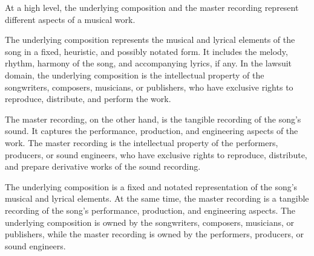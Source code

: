 At a high level, the underlying composition and the master recording represent different aspects of a musical work.

The underlying composition represents the musical and lyrical elements of the song in a fixed, heuristic, and possibly notated form. It includes the melody, rhythm, harmony of the song, and accompanying lyrics, if any. In the lawsuit domain, the underlying composition is the intellectual property of the songwriters, composers, musicians, or publishers, who have exclusive rights to reproduce, distribute, and perform the work.

The master recording, on the other hand, is the tangible recording of the song's sound. It captures the performance, production, and engineering aspects of the work. The master recording is the intellectual property of the performers, producers, or sound engineers, who have exclusive rights to reproduce, distribute, and prepare derivative works of the sound recording.

The underlying composition is a fixed and notated representation of the song's musical and lyrical elements. At the same time, the master recording is a tangible recording of the song's performance, production, and engineering aspects. The underlying composition is owned by the songwriters, composers, musicians, or publishers, while the master recording is owned by the performers, producers, or sound engineers.